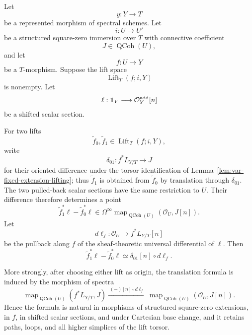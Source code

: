 \begin{lemma}
\label{lem:var-square-zero-translation}
Let
\[
    y:Y\longrightarrow T
\]
be a represented morphism of spectral schemes.  Let
\[
    i:U\longrightarrow U'
\]
be a structured square-zero immersion over \(T\) with connective coefficient
\[
    J\in\operatorname{QCoh}(U),
\]
and let
\[
    f:U\longrightarrow Y
\]
be a \(T\)-morphism.  Suppose the lift space
\[
    \operatorname{Lift}_T(f;i,Y)
\]
is nonempty.  Let
\[
    \ell:
    \mathbf 1_Y
    \longrightarrow
    \mathcal O^{\mathrm{add}}_Y[n]
\]
be a shifted scalar section.

For two lifts
\[
    \widetilde f_0,\widetilde f_1
    \in
    \operatorname{Lift}_T(f;i,Y),
\]
write
\[
    \delta_{01}:
    f^*L_{Y/T}
    \longrightarrow
    J
\]
for their oriented difference under the torsor identification of Lemma~\ref{lem:var-fixed-extension-lifting}; thus \(\widetilde f_1\) is obtained from \(\widetilde f_0\) by translation through \(\delta_{01}\).  The two pulled-back scalar sections have the same restriction to \(U\).  Their difference therefore determines a point
\[
    \widetilde f_1^*\ell-\widetilde f_0^*\ell
    \in
    \Omega^\infty
    \operatorname{map}_{\operatorname{QCoh}(U)}
    (\mathcal O_U,J[n]).
\]
Let
\[
    d\ell_f:
    \mathcal O_U
    \longrightarrow
    f^*L_{Y/T}[n]
\]
be the pullback along \(f\) of the sheaf-theoretic universal differential of \(\ell\).  Then
\[
    \boxed{
    \widetilde f_1^*\ell-\widetilde f_0^*\ell
    \simeq
    \delta_{01}[n]\circ d\ell_f.
    }
\]

More strongly, after choosing either lift as origin, the translation formula is induced by the morphism of spectra
\[
    \boxed{
    \operatorname{map}_{\operatorname{QCoh}(U)}
    (f^*L_{Y/T},J)
    \xrightarrow{\;(-)[n]\circ d\ell_f\;}
    \operatorname{map}_{\operatorname{QCoh}(U)}
    (\mathcal O_U,J[n]).
    }
\]
Hence the formula is natural in morphisms of structured square-zero extensions, in \(f\), in shifted scalar sections, and under Cartesian base change, and it retains paths, loops, and all higher simplices of the lift torsor.
\end{lemma}

